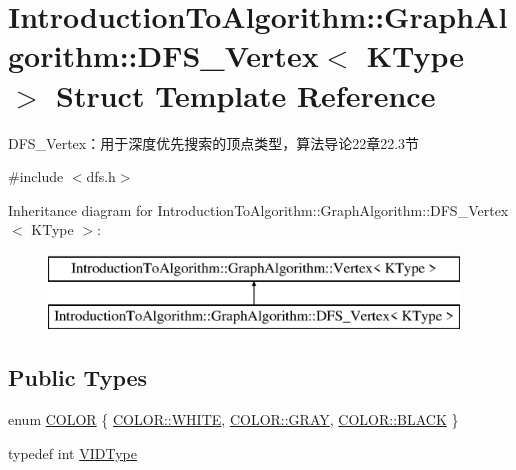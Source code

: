 \hypertarget{struct_introduction_to_algorithm_1_1_graph_algorithm_1_1_d_f_s___vertex}{}\section{Introduction\+To\+Algorithm\+:\+:Graph\+Algorithm\+:\+:D\+F\+S\+\_\+\+Vertex$<$ K\+Type $>$ Struct Template Reference}
\label{struct_introduction_to_algorithm_1_1_graph_algorithm_1_1_d_f_s___vertex}


D\+F\+S\+\_\+\+Vertex：用于深度优先搜索的顶点类型，算法导论22章22.3节  




{\ttfamily \#include $<$dfs.\+h$>$}

Inheritance diagram for Introduction\+To\+Algorithm\+:\+:Graph\+Algorithm\+:\+:D\+F\+S\+\_\+\+Vertex$<$ K\+Type $>$\+:\begin{figure}[H]
\begin{center}
\leavevmode
\includegraphics[height=2.000000cm]{struct_introduction_to_algorithm_1_1_graph_algorithm_1_1_d_f_s___vertex}
\end{center}
\end{figure}
\subsection*{Public Types}
\begin{DoxyCompactItemize}
\item 
enum \hyperlink{struct_introduction_to_algorithm_1_1_graph_algorithm_1_1_d_f_s___vertex_a9455444fdfb1b29f24c1d27e74e7c124}{C\+O\+L\+O\+R} \{ \hyperlink{struct_introduction_to_algorithm_1_1_graph_algorithm_1_1_d_f_s___vertex_a9455444fdfb1b29f24c1d27e74e7c124ab5bf627e448384cf3a4c35121ca6008d}{C\+O\+L\+O\+R\+::\+W\+H\+I\+T\+E}, 
\hyperlink{struct_introduction_to_algorithm_1_1_graph_algorithm_1_1_d_f_s___vertex_a9455444fdfb1b29f24c1d27e74e7c124a48bf014c704c9eaae100a98006a37bf7}{C\+O\+L\+O\+R\+::\+G\+R\+A\+Y}, 
\hyperlink{struct_introduction_to_algorithm_1_1_graph_algorithm_1_1_d_f_s___vertex_a9455444fdfb1b29f24c1d27e74e7c124a08d0012388564e95c3b4a7407cf04965}{C\+O\+L\+O\+R\+::\+B\+L\+A\+C\+K}
 \}
\item 
typedef int \hyperlink{struct_introduction_to_algorithm_1_1_graph_algorithm_1_1_d_f_s___vertex_aeb115a10366eb62880d2672d4e1da7a1}{V\+I\+D\+Type}
\end{DoxyCompactItemize}
